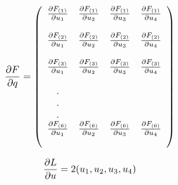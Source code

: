 \begin{equation}
    \frac{\partial F}{\partial q} = \left(
    \begin{array}{c c c c c c}
    \frac{\partial F_{(1)}}{\partial u_1} & \frac{\partial F_{(1)}}{\partial u_2} & \frac{\partial F_{(1)}}{\partial u_3} & \frac{\partial F_{(1)}}{\partial u_4} \\\\

    \frac{\partial F_{(2)}}{\partial u_1} & \frac{\partial F_{(2)}}{\partial u_2} & \frac{\partial F_{(2)}}{\partial u_3} & \frac{\partial F_{(2)}}{\partial u_4} \\\\

    \frac{\partial F_{(3)}}{\partial u_1} & \frac{\partial F_{(3)}}{\partial u_2} & \frac{\partial F_{(3)}}{\partial u_3} & \frac{\partial F_{(3)}}{\partial u_4} \\\\
    .\\
    .\\
    .\\
    \frac{\partial F_{(6)}}{\partial u_1} & \frac{\partial F_{(6)}}{\partial u_2} & \frac{\partial F_{(6)}}{\partial u_3} & \frac{\partial F_{(6)}}{\partial u_4} \\\\

    \end{array}\right)
\end{equation}

\begin{equation}
    \frac{\partial L}{\partial u} = 2 (u_1 , u_2 , u_3 , u_4)
\end{equation}


